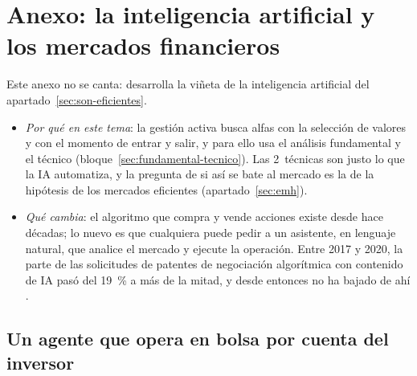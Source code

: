 \documentclass[11pt]{article}
\begin{document}
\section{Anexo: la inteligencia artificial\cortetitulo{} y los mercados financieros}\label{anexo:ia}

Este anexo no se canta: desarrolla la viñeta de la inteligencia artificial del apartado~\ref{sec:son-eficientes}.

\begin{itemize}
\item \emph{Por qué en este tema}: la gestión activa busca alfas con la selección de valores y con el momento de entrar y salir, y para ello usa el análisis fundamental y el técnico (bloque~\ref{sec:fundamental-tecnico}). Las 2~técnicas son justo lo que la IA automatiza, y la pregunta de si así se bate al mercado es la de la hipótesis de los mercados eficientes (apartado~\ref{sec:emh}).
\item \emph{Qué cambia}: el algoritmo que compra y vende acciones existe desde hace décadas; lo nuevo es que cualquiera puede pedir a un asistente, en lenguaje natural, que analice el mercado y ejecute la operación. Entre 2017 y 2020, la parte de las solicitudes de patentes de negociación algorítmica con contenido de IA pasó del 19~\% a más de la mitad, y desde entonces no ha bajado de ahí \parencite{FMIBlog2024AI}.
\end{itemize}

\subsection{Un agente que opera en bolsa por cuenta del inversor}
\end{document}
